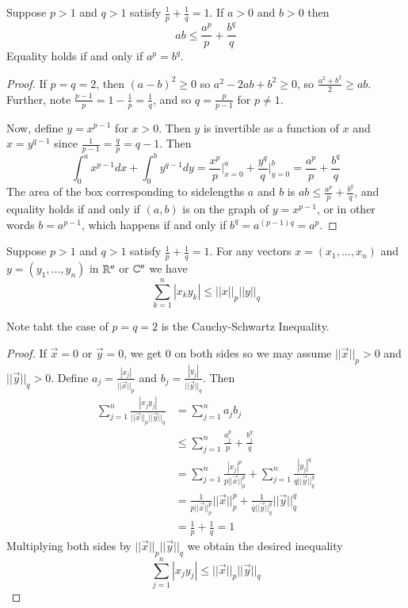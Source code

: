 \begin{lem}
    Suppose $p > 1$ and $q > 1$ satisfy $\frac{1}{p} + \frac{1}{q} = 1$. If $a > 0$ and $b> 0$ then $$ab \leq \frac{a^p}{p} + \frac{b^q}{q}$$ Equality holds if and only if $a^p=b^q$.
\end{lem}
\begin{proof}
    If $p = q = 2$, then $(a-b)^2 \geq 0$ so $a^2-2ab + b^2 \geq 0$, so $\frac{a^2+b^2}{2} \geq ab$. Further, note $\frac{p-1}{p} = 1-\frac{1}{p} = \frac{1}{q}$, and so $q = \frac{p}{p-1}$ for $p \neq 1$.

    Now, define $y = x^{p-1}$ for $x > 0$. Then $y$ is invertible as a function of $x$ and $x = y^{q-1}$ since $\frac{1}{p-1} = \frac{q}{p} = q-1$. Then $$\int_0^ax^{p-1}dx + \int_0^by^{q-1}dy = \frac{x^p}{p}\Big\rvert_{x=0}^a + \frac{y^q}{q}\Big\rvert_{y=0}^b = \frac{a^p}{p} + \frac{b^q}{q}$$ The area of the box corresponding to sidelengths $a$ and $b$ is $ab \leq \frac{a^p}{p}+\frac{b^q}{q}$, and equality holds if and only if $(a,b)$ is on the graph of $y=x^{p-1}$, or in other words $b = a^{p-1}$, which happens if and only if $b^q = a^{(p-1)q} = a^p$.
\end{proof}

\begin{lem}
    Suppose $p > 1$ and $q > 1$ satisfy $\frac{1}{p} + \frac{1}{q} = 1$. For any vectors $x = (x_1,...,x_n)$ and $y = (y_1,...,y_n)$ in $\mathbb R^n$ or $\mathbb C^n$ we have $$\sum_{k=1}^n|x_ky_k| \leq ||x||_p||y||_q$$
\end{lem}
Note taht the case of $p = q = 2$ is the Cauchy-Schwartz Inequality.

\begin{proof}
    If $\vec{x} = 0$ or $\vec{y} = 0$, we get $0$ on both sides so we may assume $||\vec{x}||_p > 0$ and $||\vec{y}||_q > 0$. Define $a_j = \frac{|x_j|}{||\vec{x}||_p}$ and $b_j = \frac{|y_j|}{||\vec{y}||_q}$. Then \begin{align*}
        \sum_{j=1}^n\frac{|x_jy_j|}{||\vec{x}||_p||\vec{y}||_q} &= \sum_{j=1}^na_jb_j \\
        &\leq \sum_{j=1}^n\frac{a_j^p}{p} +\frac{b_j^q}{q}\tag{by Young's Inequality} \\
        &= \sum_{j=1}^n\frac{|x_j|^p}{p||\vec{x}||_p^p} + \sum_{j=1}^n\frac{|y_j|^q}{q||\vec{y}||_q^q} \\
        &= \frac{1}{p||\vec{x}||_p^p}||\vec{x}||_p^p + \frac{1}{q||\vec{y}||_q^q}||\vec{y}||_q^q \\
        &= \frac{1}{p} + \frac{1}{q} = 1
    \end{align*}
    Multiplying both sides by $||\vec{x}||_p||\vec{y}||_q$ we obtain the desired inequality $$\sum_{j=1}^n|x_jy_j| \leq ||\vec{x}||_p||\vec{y}||_q$$
\end{proof}

